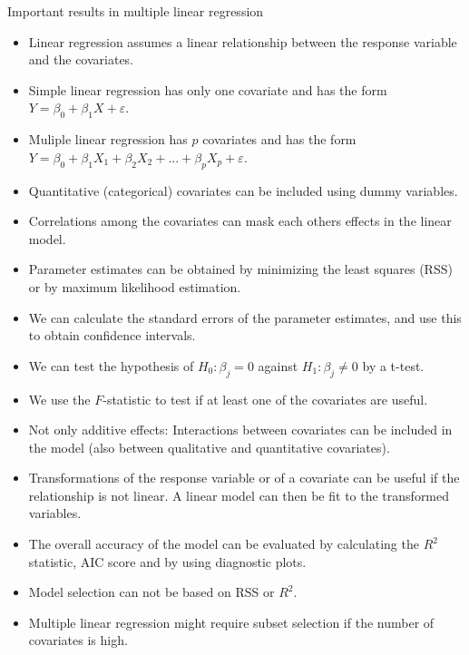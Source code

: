 \documentclass[ignorenonframetext,]{beamer}
\providecommand{\tightlist}{%
  \setlength{\itemsep}{0pt}\setlength{\parskip}{0pt}}
\begin{document}
\begin{frame}

\end{frame}

\begin{frame}{Important results in multiple linear regression}

\begin{itemize}
\tightlist
\item
  Linear regression assumes a linear relationship between the response
  variable and the covariates.
\item
  Simple linear regression has only one covariate and has the form
  \(Y = \beta_0 + \beta_1 X + \varepsilon\).
\item
  Muliple linear regression has \(p\) covariates and has the form
  \(Y = \beta_0 + \beta_1 X_1 + \beta_2 X_2 + ... + \beta_p X_p + \varepsilon\).
\item
  Quantitative (categorical) covariates can be included using dummy
  variables.
\item
  Correlations among the covariates can mask each others effects in the
  linear model.
\item
  Parameter estimates can be obtained by minimizing the least squares
  (RSS) or by maximum likelihood estimation.
\item
  We can calculate the standard errors of the parameter estimates, and
  use this to obtain confidence intervals.
\item
  We can test the hypothesis of \(H_0 : \beta_j = 0\) against
  \(H_1: \beta_j \neq 0\) by a t-test.
\item
  We use the \(F\)-statistic to test if at least one of the covariates
  are useful.
\end{itemize}

\end{frame}

\begin{frame}

\begin{itemize}
\item
  Not only additive effects: Interactions between covariates can be
  included in the model (also between qualitative and quantitative
  covariates).
\item
  Transformations of the response variable or of a covariate can be
  useful if the relationship is not linear. A linear model can then be
  fit to the transformed variables.
\item
  The overall accuracy of the model can be evaluated by calculating the
  \(R^2\) statistic, AIC score and by using diagnostic plots.
\item
  Model selection can not be based on RSS or \(R^2\).
\item
  Multiple linear regression might require subset selection if the
  number of covariates is high.
\end{itemize}

\end{frame}
\end{document}

